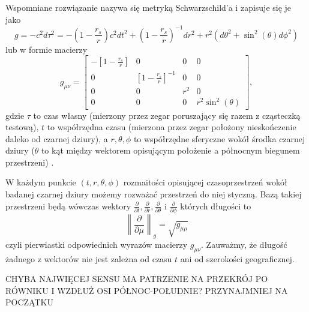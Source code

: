 Wspomniane rozwiązanie nazywa się metryką Schwarzschild'a i zapisuje się je jako
$$g=-c^2d\tau^2=- \left( 1-\frac{r_s}{r}  \right) c^2dt^2 + \left(1-\frac{r_s}{r} \right)^{-1}dr^2 +r^2(d\theta^2+\sin^2(\theta)d\phi^2) $$
lub w formie macierzy
$$g_{\mu\nu}=\begin{bmatrix}
  -\left[1-\frac{r_s}{r}\right] & 0 & 0 & 0\\ 
  0 & \left[1-\frac{r_s}{r}\right]^{-1} & 0 & 0\\ 
  0 & 0 & r^2 & 0\\ 
  0 & 0 & 0 & r^2\sin^2(\theta)
\end{bmatrix},$$ 
gdzie $\tau$ to czas własny (mierzony przez zegar poruszający się razem z cząsteczką testową), $t$ to współrzędna czasu (mierzona przez zegar położony nieskończenie daleko od czarnej dziury), a $r,\theta,\phi$ to współrzędne sferyczne wokół środka czarnej dziury ($\theta$ to kąt między wektorem opisującym położenie a północnym biegunem przestrzeni) \cite{notatkiUoCSD}.

W każdym punkcie $(t, r, \theta, \phi)$ rozmaitości opisującej czasoprzestrzeń wokół badanej czarnej dziury możemy rozważać przestrzeń do niej styczną. Bazą takiej przestrzeni będą wówczas wektory $\frac{\partial}{\partial t}, \frac{\partial}{\partial r}, \frac{\partial}{\partial \theta}$ i $\frac{\partial}{\partial \phi}$ których długości to
$$\left\|\frac{\partial}{\partial\mu}\right\|_g=\sqrt{g_{\mu\mu}}$$
czyli pierwiastki odpowiednich wyrazów macierzy $g_{\mu\nu}$. Zauważmy, że długość żadnego z wektorów nie jest zależna od czasu $t$ ani od szerokości geograficznej.



{\large\color{red}CHYBA NAJWIĘCEJ SENSU MA PATRZENIE NA PRZEKRÓJ PO RÓWNIKU I WZDŁUŻ OSI PÓŁNOC-POŁUDNIE? PRZYNAJMNIEJ NA POCZĄTKU}
